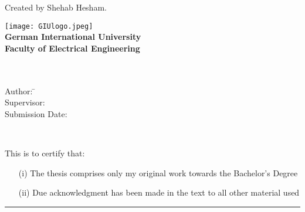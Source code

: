 	Created by Shehab Hesham.
	
\newcommand{\pageTitle}{

\thispagestyle{empty}
\begin{center}
	\texttt{[image: GIUlogo.jpeg]}\\[10mm]
	\textbf{German International University}\\[2mm]
		\textbf{Faculty of Electrical Engineering}\\[1mm]

	
	\vspace{2cm}
	\doublespacing
	{\Huge \textbf{\titleOfThesisOne}}\\
	\singlespacing
	\vspace{2cm}
	{\large \textbf{\typeOfThesis}}\\
	
	\vfill
	\parbox{1cm}{
  		\begin{large}
    			\begin{tabbing}
       			Author: \hspace{2cm}  
        			\=\authorOfThesis\\[2mm]
      			Supervisor: 
        			\>\supervisorOne\\[2mm]
      			Submission Date: 
        			\>\submissionDate\\
    			\end{tabbing}
  		\end{large}
	}\\
\end{center}
\clearpage
}
\pageTitle
\thispagestyle{empty}
This is to certify that:
\begin{itemize}
\item[(i)] The thesis comprises only my original work towards the Bachelor's Degree
\item[(ii)] Due acknowledgment has been made in the text to all other material used
\end{itemize}

\vspace{2cm}
\begin{flushright}
\rule[0mm]{6cm}{0.2mm}\\
\authorOfThesis\\
\submissionDate
\end{flushright}
\clearpage

%
